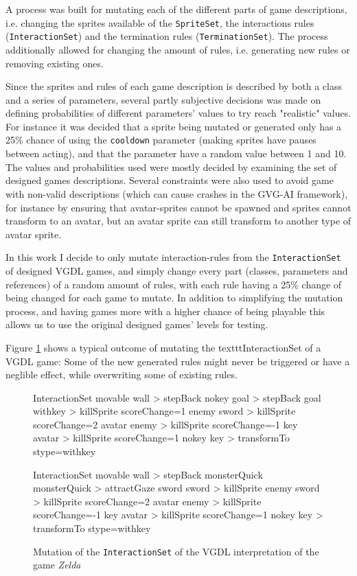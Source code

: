 \documentclass[a4paper,titlepage,final]{report}
\begin{document}
A process was built for mutating each of the different parts of game descriptions, i.e. changing the sprites available of the \texttt{SpriteSet}, the interactions rules (\texttt{InteractionSet}) and the termination rules (\texttt{TerminationSet}).
The process additionally allowed for changing the amount of rules, i.e. generating new rules or removing existing ones.

Since the sprites and rules of each game description is described by both a class and a series of parameters, several partly subjective decisions was made on defining probabilities of different parameters' values to try reach "realistic" values.
For instance it was decided that a sprite being mutated or generated only has a 25\% chance of using the \texttt{cooldown} parameter (making sprites have pauses between acting), and that the parameter have a random value between 1 and 10.
The values and probabilities used were mostly decided by examining the set of designed games descriptions.
Several constraints were also used to avoid game with non-valid descriptions (which can cause crashes in the GVG-AI framework), for instance by ensuring that avatar-sprites cannot be spawned and sprites cannot transform to an avatar, but an avatar sprite can still transform to another type of avatar sprite.

In this work I decide to only mutate interaction-rules from the \texttt{InteractionSet} of designed VGDL games, and simply change every part (classes, parameters and references) of a random amount of rules, with each rule having a 25\% change of being changed for each game to mutate.
In addition to simplifying the mutation process, and having games more with a higher chance of being playable this allows us to use the original designed games' levels for testing.

Figure \ref{fig:mutatedzelda} shows a typical outcome of mutating the texttt{InteractionSet} of a VGDL game: Some of the new generated rules might never be triggered or have a neglible effect, while overwriting some of existing rules.


\begin{figure}[!ht]
\centering
\begin{vgdldesc}[linewidth=14cm]
InteractionSet
	movable wall  > stepBack
	nokey goal    > stepBack
	goal withkey  > killSprite scoreChange=1
	enemy sword > killSprite scoreChange=2
	avatar enemy > killSprite scoreChange=-1
	key  avatar   > killSprite scoreChange=1
	nokey key     > transformTo stype=withkey  

InteractionSet
	movable wall > stepBack
	monsterQuick monsterQuick > attractGaze
	sword sword > killSprite
	enemy sword > killSprite scoreChange=2
	avatar enemy > killSprite scoreChange=-1
	key avatar > killSprite scoreChange=1
	nokey key > transformTo stype=withkey
\end{vgdldesc}
\caption{Mutation of the \texttt{InteractionSet} of the VGDL interpretation of the game \textit{Zelda}}
\label{fig:mutatedzelda}
\end{figure}
\end{document}
